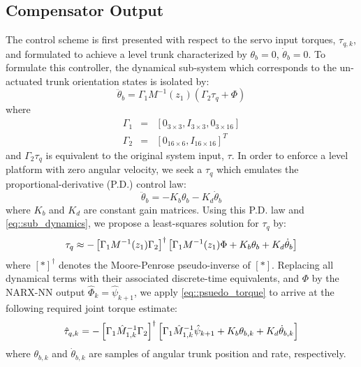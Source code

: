 		\subsection{Compensator Output}

			The control scheme is first presented with respect to the servo input torques, $\tau_{q,k}$, and formulated to achieve a level trunk characterized by $\theta_{b}=0$, $\dot{\theta}_{b}= 0$. To formulate this controller, the dynamical sub-system which corresponds to the un-actuated trunk orientation states is isolated by:
				\begin{equation}
					\ddot{\theta}_{b} 	= \Gamma_{1} M^{-1}(z_{1})( \Gamma_{2}\tau_{q}	 + \Phi)
					\label{eq::sub_dynamics}
				\end{equation}
			where 
				\begin{eqnarray*}
					\Gamma_{1} &=& [0_{3\times3},I_{3\times3},0_{3\times16}] \nonumber\\
					\Gamma_{2} &=& [0_{16\times6},I_{16\times16}]^{T}	
				\end{eqnarray*}
			and $\Gamma_{2}\tau_{q}$ is equivalent to the original system input, $\tau$. In order to enforce a level platform with zero angular velocity, we seek a $\tau_{q}$ which emulates the proportional-derivative (P.D.) control law:
				\begin{equation}
				 	\ddot{\theta}_{b} = - K_{b}{\theta}_{b} - K_{d}\dot{\theta}_{b}
				\end{equation}
			where $K_{b}$ and $K_{d}$ are constant gain matrices. Using this P.D. law and \ref{eq::sub_dynamics}, we propose a least-squares solution for $\tau_{q}$ by:
				\begin{equation}
					\tau_{q} \approx -\left[\Gamma_{1} M^{-1}(z_{1}) \Gamma_{2}\right]^{\dagger}
					\left[\Gamma_{1} M^{-1}(z_{1})\Phi + K_{b}{\theta}_{b} + K_{d}\dot{\theta}_{b}\right]
					\label{eq::psuedo_torque}
				\end{equation}
			where $\left[*\right]^{\dagger}$ denotes the Moore-Penrose pseudo-inverse of $[*]$.
			Replacing all dynamical terms with their associated discrete-time equivalents, and $\Phi$ by the NARX-NN output $\hat{\Phi}_{k}=\hat{\psi}_{k+1}$, we apply \ref{eq::psuedo_torque} to arrive at the following required joint torque estimate:
				\begin{equation}
					\hat{\tau}_{q,k} =  -\left[\Gamma_{1} \hat{M}^{-1}_{1,k} \Gamma_{2}\right]^{\dagger} 
					\left[\Gamma_{1}\hat{M}^{-1}_{1,k}\hat{\psi}_{k+1} + K_{b}{\theta}_{b,k} + K_{d}\dot{\theta}_{b,k}\right]
					\label{eq::psuedo_torque_k}
				\end{equation}
			where ${\theta}_{b,k}$ and $\dot{\theta}_{b,k}$ are samples of angular trunk position and rate, respectively.


